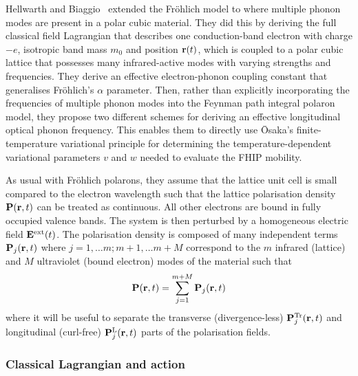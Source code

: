 Hellwarth and Biaggio~\cite{hellwarth_mobility_1999} extended the Fr\"ohlich model to where multiple phonon modes are present in a polar cubic material. They did this by deriving the full classical field Lagrangian that describes one conduction-band electron with charge $-e$, isotropic band mass $m_0$ and position $\vb{r}(t)$, which is coupled to a polar cubic lattice that possesses many infrared-active modes with varying strengths and frequencies. They derive an effective electron-phonon coupling constant that generalises Fr\"ohlich's $\alpha$ parameter. Then, rather than explicitly incorporating the frequencies of multiple phonon modes into the Feynman path integral polaron model, they propose two different schemes for deriving an effective longitudinal optical phonon frequency. This enables them to directly use \=Osaka's finite-temperature variational principle for determining the temperature-dependent variational parameters $v$ and $w$ needed to evaluate the FHIP mobility. 

As usual with Fr\"ohlich polarons, they assume that the lattice unit cell is small compared to the electron wavelength such that the lattice polarisation density $\vb{P}(\vb{r}, t)$ can be treated as continuous. All other electrons are bound in fully occupied valence bands. The system is then perturbed by a homogeneous electric field $\vb{E}^{\text{ext}}(t)$. The polarisation density is composed of many independent terms $\vb{P}_j(\vb{r}, t)$ where $j = 1, \dots m; m + 1, \dots m + M$ correspond to the $m$ infrared (lattice) and $M$ ultraviolet (bound electron) modes of the material such that
\begin{equation}
    \vb{P}(\vb{r}, t) = \sum_{j = 1}^{m + M} \vb{P}_j(\vb{r}, t)
\end{equation}
where it will be useful to separate the transverse (divergence-less) $\vb{P}_j^{\text{Tr}}(\vb{r}, t)$ and longitudinal (curl-free) $\vb{P}_j^{\text{L}}(\vb{r}, t)$ parts of the polarisation fields.

\subsubsection{Classical Lagrangian and action}
\label{subsubsec:2-3-3-1}


